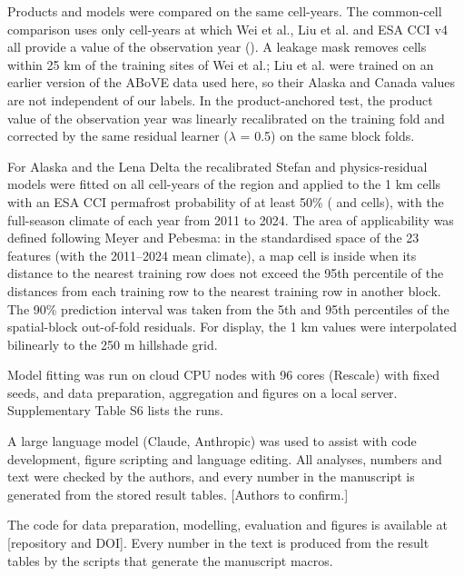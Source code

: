 Products and models were compared on the same cell-years. The common-cell comparison uses only cell-years at which Wei et al., Liu et al. and ESA CCI v4 all provide a value of the observation year (\nyrscc). A leakage mask removes cells within 25 km of the training sites of Wei et al.; Liu et al. were trained on an earlier version of the ABoVE data used here\cite{Liu2024}, so their Alaska and Canada values are not independent of our labels. In the product-anchored test, the product value of the observation year was linearly recalibrated on the training fold and corrected by the same residual learner ($\lambda$ = 0.5) on the same block folds.

For Alaska and the Lena Delta the recalibrated Stefan and physics-residual models were fitted on all cell-years of the region and applied to the 1 km cells with an ESA CCI permafrost probability of at least 50\% (\nncellmapAk{} and \nncellmapLe{} cells), with the full-season climate of each year from 2011 to 2024. The area of applicability was defined following Meyer and Pebesma\cite{MeyerPebesma2021}: in the standardised space of the 23 features (with the 2011--2024 mean climate), a map cell is inside when its distance to the nearest training row does not exceed the 95th percentile of the distances from each training row to the nearest training row in another block. The 90\% prediction interval was taken from the 5th and 95th percentiles of the spatial-block out-of-fold residuals. For display, the 1 km values were interpolated bilinearly to the 250 m hillshade grid.

Model fitting was run on cloud CPU nodes with 96 cores (Rescale) with fixed seeds, and data preparation, aggregation and figures on a local server. Supplementary Table S6 lists the runs.

A large language model (Claude, Anthropic) was used to assist with code development, figure scripting and language editing. All analyses, numbers and text were checked by the authors, and every number in the manuscript is generated from the stored result tables. [Authors to confirm.]

The code for data preparation, modelling, evaluation and figures is available at [repository and DOI]. Every number in the text is produced from the result tables by the scripts that generate the manuscript macros.
